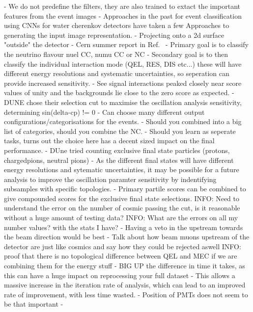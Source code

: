 - We do not predefine the filters, they are also trained to extact the important features from the event images
- Approaches in the past for event classification using CNNs for water cherenkov detectors have taken a few Approaches to generating the input image representation.
- Projecting onto a 2d surface "outside" the detector
- Cern summer report in Ref.~\cite{theodore2016}
- Primary goal is to classify the neutrino flavour nuel CC, numu CC or NC
- Secondary goal is to then classify the individual interaction mode (QEL, RES, DIS etc...) these will have different energy resolutions and systematic uncertainties, so seperation can provide increased sensitivity.
- See signal interactions peaked closely near score values of unity and the backgrounds lie close to the zero score as expected.
- DUNE chose their selection cut to maximise the oscillation analysis sensitivity, determining sin(delta-cp) != 0
- Can choose many different output configurations/categorisations for the events.
- Should you combined into a big list of categories, should you combine the NC.
- Should you learn as seperate tasks, turns out the choice here has a decent sized impact on the final performance.
- DUne tried counting exclusive final state particles (protons, chargedpions, neutral pions)
- As the different final states will have different energy resolutions and sytematic uncertainties, it may be possible for a future analysis to improve the oscillation paramter sensitivity by indentifying subsamples with specific topologies.
- Primary partile scores can be combined to give compounded scores for the exclusive final state selections.
INFO: Need to understand the error on the number of cosmic passing the cut, is it reasonable without a huge amount of testing data?
INFO: What are the errors on all my number values? with the stats I have?
- Having a veto in the upstream towards the beam direction would be best
- Talk about how beam muons upstream of the detector are just like cosmics and say how they could be rejected aswell
INFO: proof that there is no topological difference between QEL and MEC if we are combining them for the energy stuff
- BIG UP the difference in time it takes, as this can have a huge impact on reprocessing your full dataset
- This allows a massive increase in the iteration rate of analysis, which can lead to an improved rate of improvement, with less time wasted.
- Position of PMTs does not seem to be that important
-

